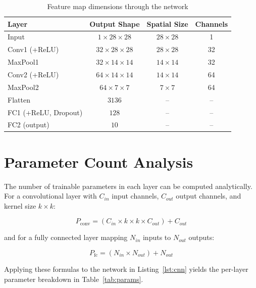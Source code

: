 \documentclass[12pt,a4paper]{report}
\begin{document}
\begin{table}[H]
\centering
\caption{Feature map dimensions through the network}
\label{tab:dims}
\begin{tabular}{@{}lccc@{}}
\toprule
\textbf{Layer} & \textbf{Output Shape} & \textbf{Spatial Size} & \textbf{Channels} \\
\midrule
Input               & $1\times28\times28$  & $28\times28$ & 1 \\
Conv1 (+ReLU)         & $32\times28\times28$ & $28\times28$ & 32 \\
MaxPool1             & $32\times14\times14$ & $14\times14$ & 32 \\
Conv2 (+ReLU)         & $64\times14\times14$ & $14\times14$ & 64 \\
MaxPool2             & $64\times7\times7$   & $7\times7$   & 64 \\
Flatten              & $3136$               & --           & -- \\
FC1 (+ReLU, Dropout)  & $128$                & --           & -- \\
FC2 (output)         & $10$                 & --           & -- \\
\bottomrule
\end{tabular}
\end{table}

\section{Parameter Count Analysis}
The number of trainable parameters in each layer can be computed analytically. For a convolutional layer with $C_{in}$ input channels, $C_{out}$ output channels, and kernel size $k \times k$:

\begin{equation}
    P_{\text{conv}} = (C_{in} \times k \times k \times C_{out}) + C_{out}
\end{equation}

and for a fully connected layer mapping $N_{in}$ inputs to $N_{out}$ outputs:

\begin{equation}
    P_{\text{fc}} = (N_{in} \times N_{out}) + N_{out}
\end{equation}

Applying these formulas to the network in Listing~\ref{lst:cnn} yields the per-layer parameter breakdown in Table~\ref{tab:params}.
\end{document}
